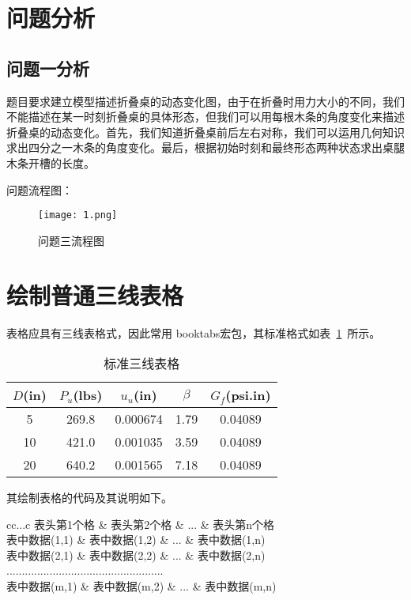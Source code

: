 \documentclass[withoutpreface,bwprint]{cumcmthesis} %
\begin{document}
\section{问题分析}

\subsection{问题一分析}
题目要求建立模型描述折叠桌的动态变化图，由于在折叠时用力大小的不同，我们不能描述在某一时刻折叠桌的具体形态，但我们可以用每根木条的角度变化来描述折叠桌的动态变化。首先，我们知道折叠桌前后左右对称，我们可以运用几何知识求出四分之一木条的角度变化。最后，根据初始时刻和最终形态两种状态求出桌腿木条开槽的长度。




问题流程图：
\begin{figure}[!h]
\centering
\texttt{[image: 1.png]}
\caption{问题三流程图}
\end{figure}

\section{绘制普通三线表格}
表格应具有三线表格式，因此常用 booktabs宏包，其标准格式如表~\ref{tab001}~所示。
\begin{table}[!htbp]
\caption{标准三线表格}\label{tab001} \centering
\begin{tabular}{ccccc}
\toprule[1.5pt]
$D$(in) & $P_u$(lbs) & $u_u$(in) & $\beta$ & $G_f$(psi.in)\\
\midrule[1pt]
 5 & 269.8 & 0.000674 & 1.79 & 0.04089\\
10 & 421.0 & 0.001035 & 3.59 & 0.04089\\
20 & 640.2 & 0.001565 & 7.18 & 0.04089\\
\bottomrule[1.5pt]
\end{tabular}
\end{table}

其绘制表格的代码及其说明如下。
\begin{tcode}
\begin{table}[!htbp]
\caption[标签名]{中文标题}
\begin{tabular}{cc...c}
\toprule[1.5pt]
表头第1个格   & 表头第2个格   & ... & 表头第n个格  \\
\midrule[1pt]
表中数据(1,1) & 表中数据(1,2) & ... & 表中数据(1,n)\\
表中数据(2,1) & 表中数据(2,2) & ... & 表中数据(2,n)\\
...................................................\\
表中数据(m,1) & 表中数据(m,2) & ... & 表中数据(m,n)\\
\bottomrule[1.5pt]
\end{tabular}
\end{table}
\end{tcode}
\end{document}

